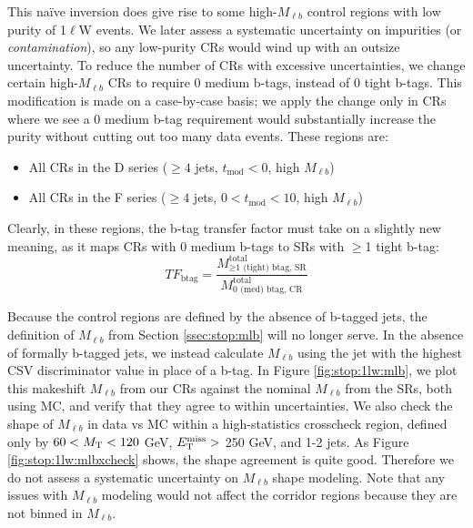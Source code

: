 This na\"{i}ve inversion does give rise to some high-$M_{\ell b}$ control regions with low
purity of 1$\ell$W events. We later assess a systematic uncertainty on
impurities (or \emph{contamination}), so any low-purity CRs would wind up
with an outsize uncertainty. To reduce the number of CRs with
excessive uncertainties, we change certain high-$M_{\ell b}$ CRs to
require 0 medium b-tags, instead of 0 tight b-tags. This modification
is made on a case-by-case basis; we apply the change only in CRs where
we see a 0 medium b-tag requirement would substantially increase the
purity without cutting out too many data events. These regions are:
\begin{itemize}
\item All CRs in the D series ($\geq 4$ jets, $t_\text{mod} < 0$, high $M_{\ell b}$)
\item All CRs in the F series ($\geq 4$ jets, $0 < t_\text{mod} < 10$, high $M_{\ell b}$)
\end{itemize}
Clearly, in these regions, the b-tag transfer factor must take
on a slightly new meaning, as it maps CRs with 0 medium b-tags to
SRs with $\geq$1 tight b-tag:
\begin{equation}
TF_\text{btag} = \frac{M_{\geq\text{1 (tight) btag,
      SR}}^\text{total}}{M_\text{0 (med) btag, CR}^\text{total}}
\end{equation}

Because the control regions are defined by the absence of
b-tagged jets, the definition of $M_{\ell b}$ from Section
\ref{ssec:stop:mlb} will no longer serve. In the absence of formally
b-tagged jets, we instead calculate $M_{\ell b}$ using the jet with
the highest CSV discriminator value in place of a b-tag.
In Figure \ref{fig:stop:1lw:mlb}, we plot this makeshift
$M_{\ell b}$ from our CRs against the nominal $M_{\ell b}$ from the
SRs, both using MC, and verify that they agree to within
uncertainties. We also check the shape of $M_{\ell b}$ in data vs MC
within a high-statistics crosscheck region, defined only by $60 < M_\text{T}
< 120$ GeV, $E_\text{T}^\text{miss} >$ 250 GeV, and 1-2 jets. As Figure
\ref{fig:stop:1lw:mlbxcheck} shows, the
shape agreement is quite good. Therefore we
do not assess a systematic uncertainty on $M_{\ell b}$ shape
modeling. Note that any issues with $M_{\ell b}$ modeling
would not affect the corridor regions because they are not binned in
$M_{\ell b}$.

